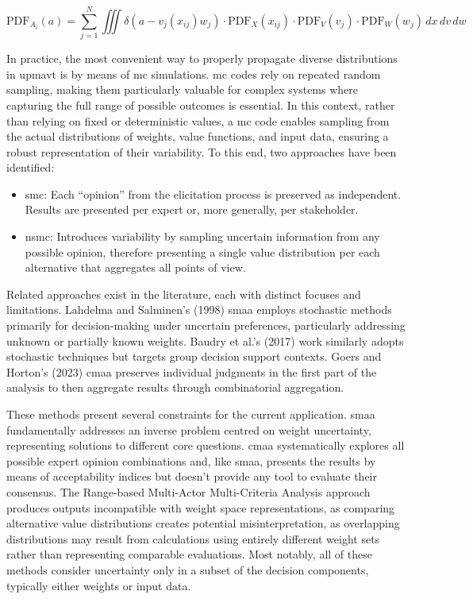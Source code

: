\begin{equation}
\text{PDF}_{A_i}(a) = \sum_{j=1}^N \iiint \delta\left(a - v_j(x_{ij})w_j\right) \cdot \text{PDF}_X(x_{ij}) \cdot \text{PDF}_V(v_j) \cdot \text{PDF}_W(w_j) \, dx \, dv \, dw
\label{eq:mavt_up}
\end{equation}

In practice, the most convenient way to properly propagate diverse distributions in \gls{upmavt} is by means of \gls{mc} simulations. \gls{mc} codes rely on repeated random sampling, making them particularly valuable for complex systems where capturing the full range of possible outcomes is essential. In this context, rather than relying on fixed or deterministic values, a \gls{mc} code enables sampling from the actual distributions of weights, value functions, and input data, ensuring a robust representation of their variability. To this end, two approaches have been identified:
\begin{itemize}
      \item \gls{smc}: Each “opinion” from the elicitation process is preserved as independent. Results are presented per expert or, more generally, per stakeholder.
      \item \gls{nsmc}: Introduces variability by sampling uncertain information from any possible opinion, therefore presenting a single value distribution per each alternative that aggregates all points of view.
\end{itemize}

Related approaches exist in the literature, each with distinct focuses and limitations. Lahdelma and Salminen's (1998) \gls{smaa} \cite{LAHDELMA1998137} employs stochastic methods primarily for decision-making under uncertain preferences, particularly addressing unknown or partially known weights. Baudry et al.'s (2017) work \cite{BAUDRY2018257} similarly adopts stochastic techniques but targets group decision support contexts. Goers and Horton's (2023) \gls{cmaa} \cite{GOERS2023243} preserves individual judgments in the first part of the analysis to then aggregate results through combinatorial aggregation. 

These methods present several constraints for the current application. \gls{smaa} fundamentally addresses an inverse problem centred on weight uncertainty, representing solutions to different core questions. \gls{cmaa} systematically explores all possible expert opinion combinations and, like \gls{smaa}, presents the results by means of acceptability indices but doesn't provide any tool to evaluate their consensus. The Range-based Multi-Actor Multi-Criteria Analysis approach \cite{BAUDRY2018257} produces outputs incompatible with weight space representations, as comparing alternative value distributions creates potential misinterpretation, as overlapping distributions may result from calculations using entirely different weight sets rather than representing comparable evaluations. Most notably, all of these methods consider uncertainty only in a subset of the decision components, typically either weights or input data.

